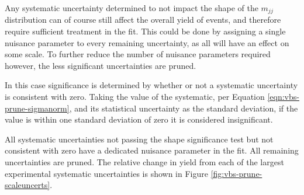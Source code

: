 Any systematic uncertainty determined to not impact the shape of the $m_{jj}$
distribution can of course still affect the overall yield of events, and
therefore require sufficient treatment in the fit. This could be done by
assigning a single nuisance parameter to every remaining uncertainty, as all
will have an effect on some scale. To further reduce the number of nuisance parameters
required however, the less significant uncertainties are pruned.

In this case significance is determined by whether or not a systematic
uncertainty is consistent with zero. Taking the value of the systematic, per
Equation \ref{eqn:vbs-prune-sigmanorm}, and its statistical uncertainty as the
standard deviation, if the value is within one standard deviation of zero it is
considered insignificant.

All systematic uncertainties not passing the shape significance test but not
consistent with zero have a dedicated nuisance parameter in the fit. All
remaining uncertainties are pruned.
The relative change in yield from each of the largest experimental systematic
uncertainties is shown in Figure \ref{fig:vbs-prune-scaleuncerts}.
